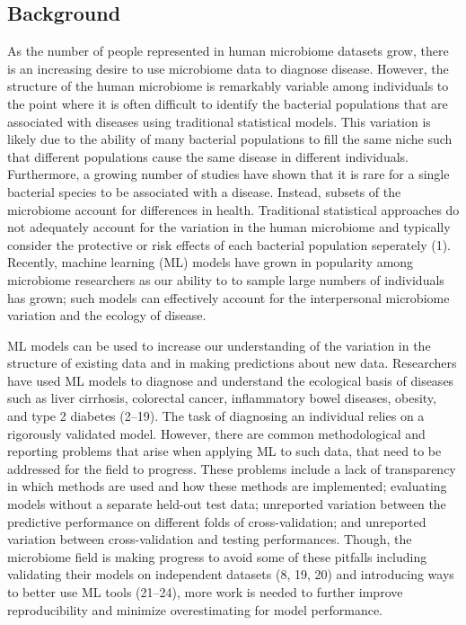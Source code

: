 \documentclass[11pt,]{article}
\begin{document}
\newpage

\subsection{Background}\label{background}

As the number of people represented in human microbiome datasets grow,
there is an increasing desire to use microbiome data to diagnose
disease. However, the structure of the human microbiome is remarkably
variable among individuals to the point where it is often difficult to
identify the bacterial populations that are associated with diseases
using traditional statistical models. This variation is likely due to
the ability of many bacterial populations to fill the same niche such
that different populations cause the same disease in different
individuals. Furthermore, a growing number of studies have shown that it
is rare for a single bacterial species to be associated with a disease.
Instead, subsets of the microbiome account for differences in health.
Traditional statistical approaches do not adequately account for the
variation in the human microbiome and typically consider the protective
or risk effects of each bacterial population seperately (1). Recently,
machine learning (ML) models have grown in popularity among microbiome
researchers as our ability to to sample large numbers of individuals has
grown; such models can effectively account for the interpersonal
microbiome variation and the ecology of disease.

ML models can be used to increase our understanding of the variation in
the structure of existing data and in making predictions about new data.
Researchers have used ML models to diagnose and understand the
ecological basis of diseases such as liver cirrhosis, colorectal cancer,
inflammatory bowel diseases, obesity, and type 2 diabetes (2--19). The
task of diagnosing an individual relies on a rigorously validated model.
However, there are common methodological and reporting problems that
arise when applying ML to such data, that need to be addressed for the
field to progress. These problems include a lack of transparency in
which methods are used and how these methods are implemented; evaluating
models without a separate held-out test data; unreported variation
between the predictive performance on different folds of
cross-validation; and unreported variation between cross-validation and
testing performances. Though, the microbiome field is making progress to
avoid some of these pitfalls including validating their models on
independent datasets (8, 19, 20) and introducing ways to better use ML
tools (21--24), more work is needed to further improve reproducibility
and minimize overestimating for model performance.
\end{document}
